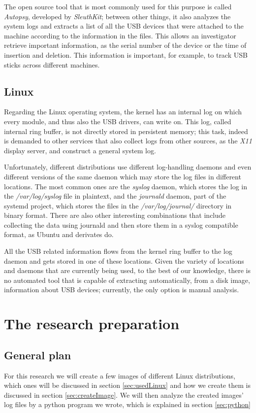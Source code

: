 \documentclass[a4paper]{article}
\begin{document}
The open source tool that is most commonly used for this purpose is called
\emph{Autopsy}, developed by \emph{SleuthKit}; between other things, it also
analyzes the system logs and extracts a list of all the USB devices that were
attached to the machine according to the information in the files. This allows
an investigator retrieve important information, as the serial number of the
device or the time of insertion and deletion. This information is important, for
example, to track USB sticks across different machines.~\cite{deb2015usb}

\subsection{Linux}
Regarding the Linux operating system, the kernel has an internal log on which
every module, and thus also the USB drivers, can write on. This log, called
internal ring buffer, is not directly stored in persistent memory; this task,
indeed is demanded to other services that also collect logs from other sources,
as the \emph{X11} display server, and construct a general system log.

Unfortunately, different distributions use different log-handling daemons and
even different versions of the same daemon which may store the log files in
different locations. The most common ones are the \emph{syslog} daemon, which
stores the log in the \emph{/var/log/syslog} file in plaintext, and the
\emph{journald} daemon, part of the systemd project, which stores the files in
the \emph{/var/log/journal/} directory in binary format. There are also other
interesting combinations that include collecting the data using journald and
then store them in a syslog compatible format, as Ubuntu and derivates
do.~\cite{poettering2012journal}

All the USB related information flows from the kernel ring buffer to the log
daemon and gets stored in one of these locations. Given the variety of locations
and daemons that are currently being used, to the best of our knowledge, there
is no automated tool that is capable of extracting automatically, from a disk
image, information about USB devices; currently, the only option is manual
analysis.

\section{The research preparation}
\subsection{General plan}
For this research we will create a few images of different Linux distributions, which ones will be discussed in section \ref{sec:usedLinux} and how we create them is discussed in section \ref{sec:createImage}. We will then analyze the created images' log files by a python program we wrote, which is explained in section \ref{sec:python}
\end{document}
